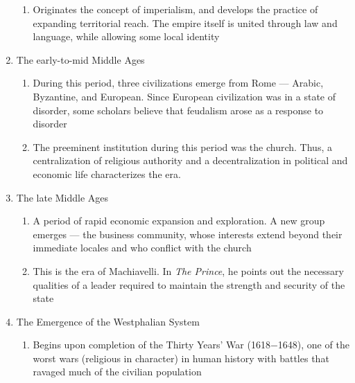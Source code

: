 \documentclass[12pt]{article}
\begin{document}
\begin{enumerate}
\begin{enumerate}
          \item Originates the concept of imperialism, and develops the practice of expanding territorial reach. The empire itself is united through law and language, while allowing some local identity

        \end{enumerate}

      \item The early-to-mid Middle Ages

        \begin{enumerate}

          \item During this period, three civilizations emerge from Rome — Arabic, Byzantine, and European. Since European civilization was in a state of disorder, some scholars believe that feudalism arose as a response to disorder

          \item The preeminent institution during this period was the church. Thus, a centralization of religious authority and a decentralization in political and economic life characterizes the era.

        \end{enumerate}

      \item The late Middle Ages

        \begin{enumerate}

          \item A period of rapid economic expansion and exploration. A new group emerges — the business community, whose interests extend beyond their immediate locales and who conflict with the church

          \item This is the era of Machiavelli. In \textit{The Prince}, he points out the necessary qualities of a leader required to maintain the strength and security of the state

        \end{enumerate}

      \item The Emergence of the Westphalian System

        \begin{enumerate}

          \item Begins upon completion of the Thirty Years' War (1618$-$1648), one of the worst wars (religious in character) in human history with battles that ravaged much of the civilian population


\end{enumerate}
\end{enumerate}
\end{document}
